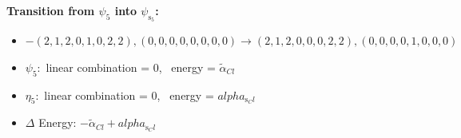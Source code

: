 \documentclass[12pt,a4paper]{article}
\begin{document}
        \noindent\textbf{Transition from $\psi_{5}$ into $\psi_{\text{s}_{5}}$:}
        \begin{itemize}
            \item $- (2, 1, 2, 0, 1, 0, 2, 2), (0, 0, 0, 0, 0, 0, 0, 0) \rightarrow (2, 1, 2, 0, 0, 0, 2, 2), (0, 0, 0, 0, 1, 0, 0, 0)$
        
            \item $\psi_{5}:$ linear combination = $0$, \
            energy = $\tilde{\alpha}_{Cl}$
            
            \item $\eta_{5}:$ linear combination = $0$, \
            energy = $alpha_{\text{s}_Cl}$
            
                \item $\Delta$ Energy: $- \tilde{\alpha}_{Cl} + alpha_{\text{s}_Cl}$

\end{itemize}
\end{document}
